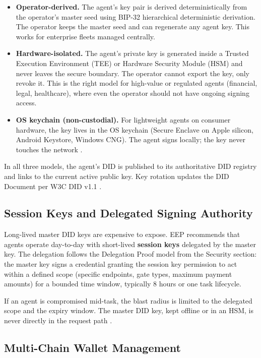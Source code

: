 \documentclass[12pt,a4paper]{article}
\begin{document}
\begin{itemize}
    \item \textbf{Operator-derived.} The agent's key pair is derived deterministically from the operator's master seed using BIP-32 hierarchical deterministic derivation. The operator keeps the master seed and can regenerate any agent key. This works for enterprise fleets managed centrally.
    \item \textbf{Hardware-isolated.} The agent's private key is generated inside a Trusted Execution Environment (TEE) or Hardware Security Module (HSM) and never leaves the secure boundary. The operator cannot export the key, only revoke it. This is the right model for high-value or regulated agents (financial, legal, healthcare), where even the operator should not have ongoing signing access.
    \item \textbf{OS keychain (non-custodial).} For lightweight agents on consumer hardware, the key lives in the OS keychain (Secure Enclave on Apple silicon, Android Keystore, Windows CNG). The agent signs locally; the key never touches the network \cite{ref23}.
\end{itemize}

In all three models, the agent's DID is published to its authoritative DID registry and links to the current active public key. Key rotation updates the DID Document per W3C DID v1.1 \cite{ref24}.

\subsection{Session Keys and Delegated Signing Authority}

Long-lived master DID keys are expensive to expose. EEP recommends that agents operate day-to-day with short-lived \textbf{session keys} delegated by the master key. The delegation follows the Delegation Proof model from the Security section: the master key signs a credential granting the session key permission to act within a defined scope (specific endpoints, gate types, maximum payment amounts) for a bounded time window, typically 8 hours or one task lifecycle.

If an agent is compromised mid-task, the blast radius is limited to the delegated scope and the expiry window. The master DID key, kept offline or in an HSM, is never directly in the request path \cite{ref23}.

\subsection{Multi-Chain Wallet Management}
\end{document}
